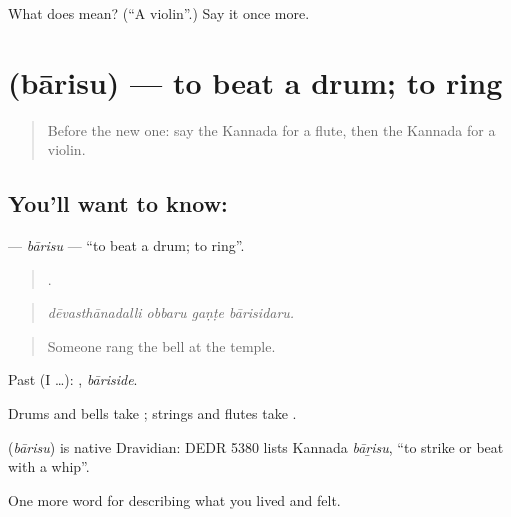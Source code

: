 \begin{tcolorbox}[breakable,colback=teal!4,colframe=teal!35!black,title={Before you move on}]
What does  mean? (\textquotedblleft{}A violin\textquotedblright{}.) Say it once more.
\end{tcolorbox}
\section[\texorpdfstring{\kn{ಬಾರಿಸು} (bārisu)}{ಬಾರಿಸು (bārisu)}]{ (bārisu) — to beat a drum; to ring}

\label{lesson:KA-C535-barisu}



\begin{quote}
Before the new one: say the Kannada for a flute, then the Kannada for a violin.
\end{quote}

\subsection*{You'll want to know: }
\textbf{} — \emph{bārisu} — \textquotedblleft{}to beat a drum; to ring\textquotedblright{}.

\begin{quote}
   .
\end{quote}

\begin{quote}
\emph{dēvasthānadalli obbaru gaṇṭe bārisidaru.}
\end{quote}

\begin{quote}
Someone rang the bell at the temple.
\end{quote}

Past (I …): , \emph{bāriside}.

Drums and bells take ; strings and flutes take .

\begin{cousinweb}
\textbf{} (\emph{bārisu}) is native Dravidian: DEDR 5380 lists Kannada \emph{bāṟisu}, \textquotedblleft{}to strike or beat with a whip\textquotedblright{}.
\end{cousinweb}

\begin{grammarlens}[title={What you've built}]
One more word for describing what you lived and felt.
\end{grammarlens}

